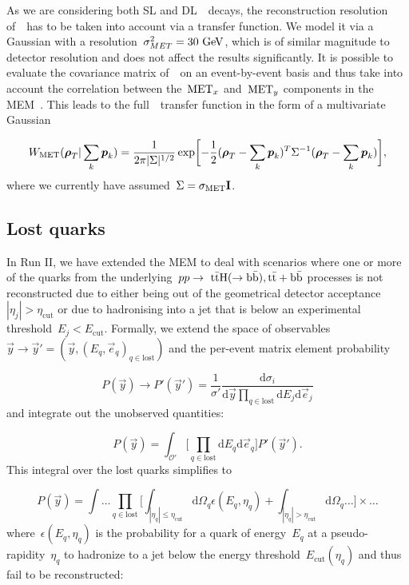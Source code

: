 As we are considering both SL and DL~\ttH~decays, the reconstruction resolution of~\MET~has to be taken into account via a transfer function. We model it via a Gaussian with a resolution~$\sigma_{MET}^2 = 30~\mathrm{GeV}$, which is of similar magnitude to detector resolution and does not affect the results significantly.
It is possible to evaluate the covariance matrix of~\MET~on an event-by-event basis and thus take into account the correlation between the~$\mathrm{MET}_x$ and~$\mathrm{MET}_y$ components in the MEM~\cite{cms_htautau}. This leads to the full~\MET~transfer function in the form of a  multivariate Gaussian

\begin{equation}
W_{\mathrm{MET}}(\boldsymbol{\rho}_T | \sum_k \boldsymbol{p}_k) = \frac{1}{2\pi |\Sigma|^{1/2}} \exp \biggl[ -\frac{1}{2} (\boldsymbol{\rho}_T - \sum_k \boldsymbol{p}_k)^T \Sigma^{-1} (\boldsymbol{\rho}_T - \sum_k \boldsymbol{p}_k)\biggr],
\end{equation}
where we currently have assumed~$\Sigma = \sigma_{\mathrm{MET}} \mathbf{I}$.

\subsection{Lost quarks}
\label{sec:lost_quarks}

In Run II, we have extended the MEM to deal with scenarios where one or more of the quarks from the underlying~$pp \rightarrow~\mathrm{t} \bar{\mathrm{t}} \mathrm{H}(\rightarrow \mathrm{b}\bar{\mathrm{b}}),\mathrm{t} \bar{\mathrm{t}} + \mathrm{b}\bar{\mathrm{b}}$ processes is not reconstructed due to either being out of the geometrical detector acceptance~$|\eta_j| > \eta_{\mathrm{cut}}$ or due to hadronising into a jet that is below an experimental threshold~$E_j < E_{\mathrm{cut}}$.
Formally, we extend the space of observables~$\vec{y} \rightarrow \vec{y}' = (\vec{y}, (E_q, \vec{e}_q)_{q \in \mathrm{lost}})$ and the per-event matrix element probability

\begin{equation}
P(\vec{y}) \rightarrow P'(\vec{y}') = \frac{1}{\sigma'} \frac{\mathrm{d} \sigma_i}{\mathrm{d}\vec{y} \prod_{q\in\mathrm{lost}} \mathrm{d}E_j \mathrm{d}\vec{e}_j}
\end{equation}
and integrate out the unobserved quantities:

\begin{equation}
P(\vec{y}) = \int_{\mathcal{O}'} \bigl[ \prod_{q \in \mathrm{lost}} \mathrm{d}E_q \mathrm{d}\vec{e}_q \bigr] P'(\vec{y}').
\end{equation}
This integral over the lost quarks simplifies to

\begin{equation}
P(\vec{y}) = \int \dots \prod_{q\in\mathrm{lost}} \biggl[ \int_{|\eta_q| \leq \eta_{\mathrm{cut}}} \mathrm{d}\Omega_q \epsilon(E_q, \eta_q) + \int_{|\eta_q| > \eta_{\mathrm{cut}}} \mathrm{d}\Omega_q \dots \biggr] \times \dots
\end{equation}
where~$\epsilon(E_q, \eta_q)$ is the probability for a quark of energy~$E_q$ at a pseudo-rapidity~$\eta_q$ to hadronize to a jet below the energy threshold~$E_{\mathrm{cut}}(\eta_q)$ and thus fail to be reconstructed:

